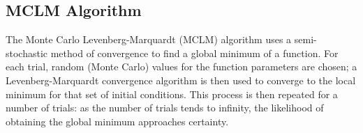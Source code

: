 \documentclass[12pt,a4paper,oneside]{article}
\begin{document}
\subsection{MCLM Algorithm}
The Monte Carlo Levenberg-Marquardt (MCLM) algorithm uses a semi-stochastic method of convergence to find a global minimum of a function. For each trial, random (Monte Carlo) values for the function parameters are chosen; a Levenberg-Marquardt convergence algorithm is then used to converge to the local minimum for that set of initial conditions. This process is then repeated for a number of trials: as the number of trials tends to infinity, the likelihood of obtaining the global minimum approaches certainty.
\end{document}
